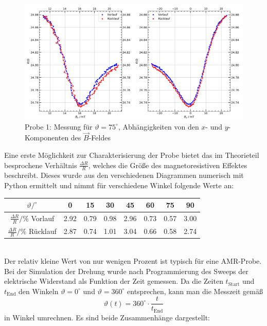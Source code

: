\documentclass[german,  %
parskip=full,  %
]{scrartcl}
\begin{document}
\begin{figure}[h!]\centering
\includegraphics[width=\textwidth]{Probe1_75_Grad.png}
\caption{Probe 1: Messung für \(\vartheta=75^{\circ}\), Abhängigkeiten von den \(x\)- und \(y\)-Komponenten des \(\vec{B}\)-Feldes}
\end{figure}
\newpage  
Eine erste Möglichkeit zur Charakterisierung der Probe bietet das im Theorieteil besprochene Verhältnis \(\frac{\Delta R}{R}\), welches die Größe des magnetoresistiven Effektes beschreibt. Dieses wurde aus den verschiedenen Diagrammen numerisch mit Python ermittelt und nimmt für verschiedene Winkel folgende Werte an: \\
\begin{table}[h!]\centering
\begin{tabular}{|c|c|c|c|c|c|c|c|}
\hline
\(\vartheta / ^{\circ}\)  & 0 & 15 & 30 & 45 & 60 & 75 & 90 \\\hline
\(\frac{\Delta R}{R} / \%\) Vorlauf & 2.92 & 0.79 & 0.98 & 2.96 & 0.73 & 0.57 & 3.00 \\\hline
\(\frac{\Delta R}{R} / \%\) Rücklauf & 2.87 & 0.74 & 1.01 & 3.04 & 0.66 & 0.58 & 2.74 \\\hline
\end{tabular}
\end{table} \\
Der relativ kleine Wert von nur wenigen Prozent ist typisch für eine AMR-Probe.
Bei der Simulation der Drehung wurde nach Programmierung des Sweeps der elektrische Widerstand als Funktion der Zeit gemessen. Da die Zeiten \(t_{\mathrm{Start}}\) und \(t_{\mathrm{End}}\) den Winkeln \(\vartheta = 0^{\circ}\) und \(\vartheta = 360^{\circ}\) entsprechen, kann man die Messzeit gemäß 
\[\vartheta(t) = 360^{\circ} \cdot \frac{t}{t_{\mathrm{End}}}\]
in Winkel umrechnen. Es sind beide Zusammenhänge dargestellt: \\\\
\end{document}
